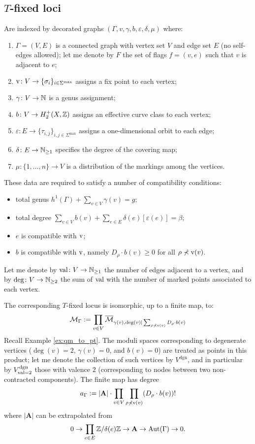 \subsection{$T$-fixed loci} Are indexed by decorated graphs
$\left(\Gamma, v, \gamma, b,\varepsilon,\delta,\mu\right)$
where:
\begin{enumerate}
 \item $\Gamma=(V,E)$ is a connected graph with vertex set $V$ and edge set $E$ (no self-edges allowed); let me denote by $F$ the set of flags $f=(v,e)$ such that $v$ is adjacent to $e$;
 \item $\operatorname{v}\colon V\rightarrow \{\sigma_i\}_{i\in\Sigma^\text{max}}$ assigns a fix point to each vertex;
 \item $\gamma\colon V\rightarrow \mathbb{N}$ is a genus assignment;
 \item $b\colon V\rightarrow H^+_2(X,\mathbb{Z})$ assigns an effective curve class to each vertex;
 \item $\varepsilon\colon E\to \{\tau_{i,j}\}_{i,j\in\Sigma^\text{max}}$ assigns a one-dimensional orbit to each edge;
 \item $\delta\colon E\rightarrow \mathbb{N}_{\geq1}$ specifies the degree of the covering map;
 \item $\mu\colon \{1,\ldots,n\}\to V$ is a distribution of the markings among the vertices.
\end{enumerate}
These data are required to satisfy a number of compatibility conditions:
\begin{itemize}
 \item total genus $h^1(\Gamma)+\sum_{v\in V} \gamma(v)=g$;
 \item total degree $\sum_{v\in V}b(v)+\sum_{e\in E}\delta(e)[\varepsilon(e)]=\beta$;
 \item $e$ is compatible with $\operatorname{v}$;
 \item $b$ is compatible with $\operatorname{v}$, namely $D_\rho\cdot b(v) \geq 0$ for all $\rho\nprec \operatorname{v}(v)$.

 \end{itemize}
Let me denote by $\operatorname{val}\colon V\rightarrow\mathbb{N}_{\geq1}$ the number of edges adjacent to a vertex, and by $\deg\colon V\rightarrow\mathbb{N}_{\geq2}$ the sum of $\operatorname{val}$ with the number of marked points associated to each vertex.

The corresponding $T$-fixed locus is isomorphic, up to a finite map, to:
\[
 \mathcal M_\Gamma:= \prod_{v\in V} \overline{\mathcal M}_{\gamma(v),\deg(v)|\sum_{\rho\nprec \operatorname{v}(v)}D_\rho\cdot b(v)}
\]
Recall Example \ref{ex:qm_to_pt}. The moduli spaces corresponding to degenerate vertices ($\deg(v)=2$, $\gamma(v)=0$, and $b(v)=0$) are treated as points in this product; let me denote the collection of such vertices by $V^{\text{dgn}}$, and in particular by $V^{\text{dgn}}_{\operatorname{val}=2}$ those with valence $2$ (corresponding to nodes between two non-contracted components). The finite map has degree \[a_\Gamma:=|\mathbf A|\cdot\prod_{v\in V}\prod_{\rho\nprec\operatorname{v}(v)}(D_\rho\cdot b(v))!\] where $|\mathbf A|$ can be extrapolated from
\[
 0\rightarrow\prod_{e\in E}\mathbb{Z}/\delta(e)\mathbb{Z}\rightarrow \mathbf A\rightarrow \operatorname{Aut}(\Gamma)\rightarrow 0.
\]

